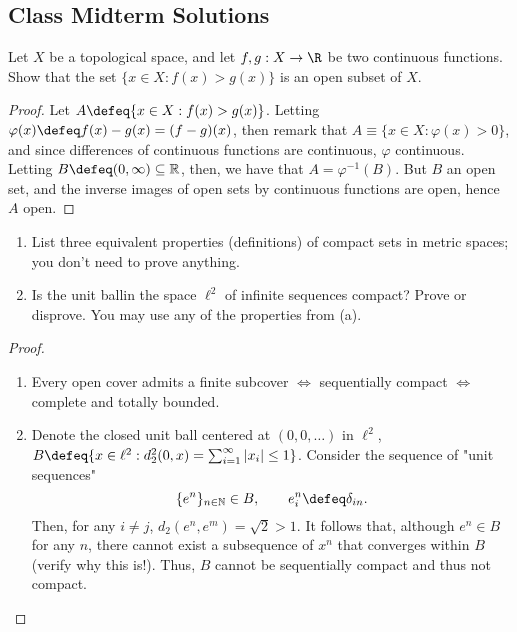\subsection{Class Midterm Solutions}

\begin{question}
    Let $X$ be a topological space, and let $f, g : X \to \R$ be two continuous functions. Show that the set $\{x \in X : f(x) > g(x)\}$ is an open subset of $X$.

    \begin{proof}
        Let $A \defeq \{x \in X : f(x) > g(x)\}$. Letting $\varphi(x) \defeq f(x) - g(x) = (f-g)(x)$, then remark that $A \equiv \{x \in X : \varphi(x) > 0\}$, and since differences of continuous functions are continuous, $\varphi$ continuous. Letting $B \defeq (0, \infty) \subseteq \mathbb{R}$, then, we have that $A = \varphi^{-1}(B)$. But $B$ an open set, and the inverse images of open sets by continuous functions are open, hence $A$ open.
    \end{proof}
\end{question}


\begin{question}
\begin{enumerate}[label=(\alph*)]
    \item List three equivalent properties (definitions) of compact sets in metric spaces; you don't need to prove anything.
    \item Is the unit ball\footnotemark in the space $\ell^2$ of infinite sequences compact? Prove or disprove. You may use any of the properties from (a).
\end{enumerate}
\begin{proof}
    \begin{enumerate}[label=(\alph*)]
        \item Every open cover admits a finite subcover $\iff$ sequentially compact $\iff$ complete and totally bounded.
        \item Denote the closed unit ball centered at $(0, 0, \dots)$ in $\ell^2$, $B \defeq \{x \in \ell^2 : d_2^2(0, x) = \sum_{i=1}^\infty\abs{x_i} \leq 1 \}$. Consider the sequence of "unit sequences" \[
            \{e^n\}_{n \in \mathbb{N}} \in B, \qquad e^n_i  \defeq \delta_{in}.
        \]
        Then, for any $i \neq j$, $d_2(e^{n}, e^m) = \sqrt{2} > 1$. It follows that, although $e^n \in B$ for any $n$, there cannot exist a subsequence of $x^n$ that converges within $B$ (verify why this is!). Thus, $B$ cannot be sequentially compact and thus not compact.
    \end{enumerate}
\end{proof}
\end{question}

